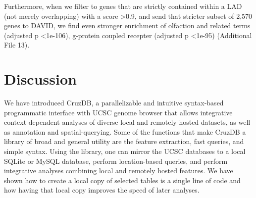 \documentclass[10pt]{bmc_article}
\newenvironment{bmcformat}{\baselineskip20pt\sloppy\setboolean{publ}{false}}{\baselineskip20pt\sloppy}
\begin{document}
\begin{bmcformat}
Furthermore, when we filter to genes that are strictly contained within a LAD (not merely overlapping) with a score \textgreater 0.9, and send that stricter subset of 2,570 genes to DAVID, we find even stronger enrichment of olfaction and related terms (adjusted p \textless  1e-106), g-protein coupled recepter (adjusted p \textless  1e-95) (Additional File 13).

\section*{Discussion}
We have introduced CruzDB, a parallelizable and intuitive syntax-based programmatic interface with UCSC genome browser that allows integrative context-dependent analyses of diverse local and remotely hosted datasets, as well as annotation and spatial-querying. Some of the functions that make CruzDB a library of broad and general utility are the feature extraction, fast queries, and simple syntax.
Using the library, one can mirror the UCSC databases to a local SQLite or MySQL database, perform location-based queries, and perform integrative analyses combining local and remotely hosted features. We have shown how to create a local copy of selected tables is a single line of code and how having that local copy improves the speed of later analyses.


\end{bmcformat}
\end{document}
